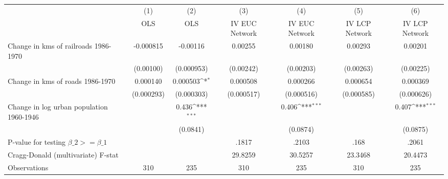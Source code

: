 {
\def\sym#1{\ifmmode^{#1}\else\(^{#1}\)\fi}
\begin{tabular}{l*{6}{c}}
\hline\hline
                &\multicolumn{1}{c}{(1)}&\multicolumn{1}{c}{(2)}&\multicolumn{1}{c}{(3)}&\multicolumn{1}{c}{(4)}&\multicolumn{1}{c}{(5)}&\multicolumn{1}{c}{(6)}\\
                &\multicolumn{1}{c}{OLS}&\multicolumn{1}{c}{OLS}&\multicolumn{1}{c}{IV EUC Network}&\multicolumn{1}{c}{IV EUC Network}&\multicolumn{1}{c}{IV LCP Network}&\multicolumn{1}{c}{IV LCP Network}\\
\hline
Change in kms of railroads 1986-1970&-0.000815         & -0.00116         &  0.00255         &  0.00180         &  0.00293         &  0.00201         \\
                &(0.00100)         &(0.000953)         &(0.00242)         &(0.00203)         &(0.00263)         &(0.00225)         \\
[1em]
Change in kms of roads 1986-1970& 0.000140         & 0.000503\sym{*}  & 0.000508         & 0.000266         & 0.000654         & 0.000369         \\
                &(0.000293)         &(0.000303)         &(0.000517)         &(0.000516)         &(0.000585)         &(0.000626)         \\
[1em]
Change in log urban population 1960-1946&                  &    0.436\sym{***}&                  &    0.406\sym{***}&                  &    0.407\sym{***}\\
                &                  & (0.0841)         &                  & (0.0874)         &                  & (0.0875)         \\
\hline
P-value for testing $\beta\_{2} >= \beta\_{1}$&                  &                  &    .1817         &    .2103         &     .168         &    .2061         \\
Cragg-Donald (multivariate) F-stat&                  &                  &  29.8259         &  30.5257         &  23.3468         &  20.4473         \\
Observations    &      310         &      235         &      310         &      235         &      310         &      235         \\
\hline\hline
\end{tabular}
}
